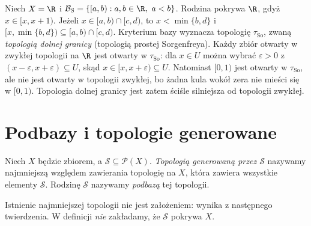 \begin{przyklad}
\label{ex:topog-sorgenfrey}
Niech $X=\R$ i
$\mathcal B_{\mathrm S}=\{[a,b):a,b\in\R,\ a<b\}$.
Rodzina pokrywa $\R$, gdyż $x\in[x,x+1)$.
Jeżeli $x\in[a,b)\cap[c,d)$, to
$x<\min\{b,d\}$ i
$[x,\min\{b,d\})\subseteq[a,b)\cap[c,d)$.
Kryterium bazy wyznacza topologię
$\tau_{\mathrm{So}}$, zwaną \emph{topologią dolnej granicy}
(topologią prostej Sorgenfreya).
Każdy zbiór otwarty w zwykłej topologii na $\R$
jest otwarty w $\tau_{\mathrm{So}}$: dla $x\in U$
można wybrać $\varepsilon>0$ z
$(x-\varepsilon,x+\varepsilon)\subseteq U$, skąd
$x\in[x,x+\varepsilon)\subseteq U$.
Natomiast $[0,1)$ jest otwarty w $\tau_{\mathrm{So}}$,
ale nie jest otwarty w topologii zwykłej,
bo żadna kula wokół zera nie mieści się w $[0,1)$.
Topologia dolnej granicy jest zatem ściśle silniejsza
od topologii zwykłej.
\end{przyklad}

\section{Podbazy i topologie generowane}
\label{sec:topog-podbazy}

\begin{definicja}
\label{def:topog-topologia-generowana}
Niech $X$ będzie zbiorem, a $\mathcal S\subseteq\mathcal P(X)$.
\emph{Topologią generowaną przez $\mathcal S$} nazywamy
najmniejszą względem zawierania topologię na $X$,
która zawiera wszystkie elementy $\mathcal S$.
Rodzinę $\mathcal S$ nazywamy \emph{podbazą} tej topologii.
\end{definicja}

Istnienie najmniejszej topologii nie jest założeniem:
wynika z następnego twierdzenia. W definicji
\emph{nie} zakładamy, że $\mathcal S$ pokrywa $X$.

